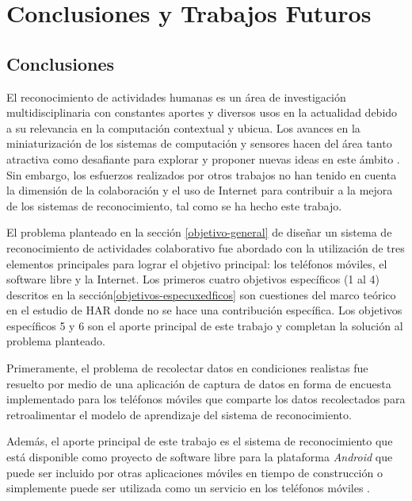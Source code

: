 
\chapter{Conclusiones y Trabajos Futuros}

\label{conclusiones-y-trabajos-futuros}

\section{Conclusiones}

\label{conclusiones}

El reconocimiento de actividades humanas es un área de investigación
multidisciplinaria con constantes aportes y diversos usos en la actualidad
debido a su relevancia en la computación contextual y ubicua. Los
avances en la miniaturización de los sistemas de computación y sensores
hacen del área tanto atractiva como desafiante para explorar y proponer
nuevas ideas en este ámbito \cite{LaraLabrador2013}. Sin embargo,
los esfuerzos realizados por otros trabajos no han tenido en cuenta
la dimensión de la colaboración y el uso de Internet para contribuir
a la mejora de los sistemas de reconocimiento, tal como se ha hecho
este trabajo.

El problema planteado en la sección \ref{objetivo-general} de diseñar
un sistema de reconocimiento de actividades colaborativo fue abordado
con la utilización de tres elementos principales para lograr el objetivo
principal: los teléfonos móviles, el software libre y la Internet.
Los primeros cuatro objetivos específicos (1 al 4) descritos en la
sección\ref{objetivos-especuxedficos} son cuestiones del marco teórico
en el estudio de HAR donde no se hace una contribución específica.
Los objetivos específicos 5 y 6 son el aporte principal de este trabajo
y completan la solución al problema planteado.

Primeramente, el problema de recolectar datos en condiciones realistas
fue resuelto por medio de una aplicación de captura de datos en forma
de encuesta implementado para los teléfonos móviles que comparte los
datos recolectados para retroalimentar el modelo de aprendizaje del
sistema de reconocimiento.

Además, el aporte principal de este trabajo es el sistema de reconocimiento
que está disponible como proyecto de software libre para la plataforma
\emph{Android} que puede ser incluido por otras aplicaciones móviles
en tiempo de construcción o simplemente puede ser utilizada como un
servicio en los teléfonos móviles \cite{hardroid2016a}.

